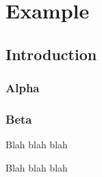 
\chapter{Example}

\section{Introduction}


\subsection{Alpha}

\subsection{Beta}


Blah blah blah


Blah blah 
blah

